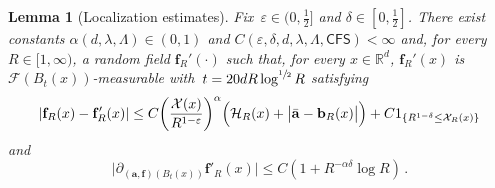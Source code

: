 \documentclass[11pt]{article} %
\numberwithin{equation}{section}
\newtheorem{lemma}[theorem]{Lemma}
\theoremstyle{definition}
\newcommand*{\R}{\ensuremath{\mathbb{R}}}
\newcommand{\eps}{\varepsilon}
\renewcommand{\b}{\ensuremath{\mathbf{b}}}
\newcommand{\f}{\mathbf{f}}
\newcommand{\ep}{\eps}
\renewcommand{\a}{\mathbf{a}}
\newcommand{\ahom}{\bar{\a}}
\newcommand{\F}{\mathcal{F}}
\newcommand{\X}{\mathcal{X}}
\newcommand{\indc}{1}
\newcommand{\CFS}{\mathsf{CFS}}
\begin{document}
\begin{lemma}[Localization estimates]
\label{l.fr.correctorloc}
Fix~$\ep \in (0,\frac12]$ and $\delta \in [0,\frac12]$. There exist constants $\alpha(d,\lambda,\Lambda) \in (0,1)$ and $C(\ep,\delta,d,\lambda,\Lambda,\CFS)<\infty$ and, for every $R \in [1,\infty)$, a random field $\f_R'(\cdot)$ such that, for every $x \in \R^d$,  $\f_R'(x)$ is~$\F(B_t(x))$-measurable with~$t = 20 d R \log^{\sfrac 12} R$ satisfying
\begin{equation} \label{e.fr.correctorloc}
| \f_R(x) - \f'_{R}(x) |  
\leq 
C
\biggl( \frac{\X(x)}{R^{1-\ep}} \biggr)^{\alpha} 
\Bigl( 
\mathcal{H}_{R}(x)  + \big| \ahom - \b_{R}(x)\big|
\Bigr) 
+ 
C \indc_{\{ R^{1-\delta} \leq \X_{R}(x) \}}
\end{equation}
and
\begin{equation}  \label{e.fr.correctorloc.malliavin}
\bigl| \partial_{(\a,\f)(B_t(x))} \f'_{R}(x)\bigr| 
\leq 
C ( 1+  R^{-\alpha \delta} \log R ) \,.
\end{equation}
\end{lemma}
\end{document}
